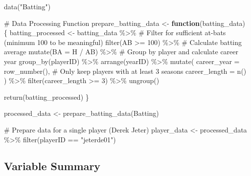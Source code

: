 \documentclass[
  letterpaper,
  DIV=11,
  numbers=noendperiod]{scrartcl}
\newenvironment{Shaded}{\begin{snugshade}}{\end{snugshade}}
\newcommand{\AttributeTok}[1]{\textcolor[rgb]{0.40,0.45,0.13}{#1}}
\newcommand{\CommentTok}[1]{\textcolor[rgb]{0.37,0.37,0.37}{#1}}
\newcommand{\ControlFlowTok}[1]{\textcolor[rgb]{0.00,0.23,0.31}{\textbf{#1}}}
\newcommand{\DecValTok}[1]{\textcolor[rgb]{0.68,0.00,0.00}{#1}}
\newcommand{\FunctionTok}[1]{\textcolor[rgb]{0.28,0.35,0.67}{#1}}
\newcommand{\NormalTok}[1]{\textcolor[rgb]{0.00,0.23,0.31}{#1}}
\newcommand{\OtherTok}[1]{\textcolor[rgb]{0.00,0.23,0.31}{#1}}
\newcommand{\SpecialCharTok}[1]{\textcolor[rgb]{0.37,0.37,0.37}{#1}}
\newcommand{\StringTok}[1]{\textcolor[rgb]{0.13,0.47,0.30}{#1}}
\begin{document}
\begin{Shaded}
\begin{Highlighting}[]
\FunctionTok{data}\NormalTok{(}\StringTok{"Batting"}\NormalTok{)}


\CommentTok{\# Data Processing Function}
\NormalTok{prepare\_batting\_data }\OtherTok{\textless{}{-}} \ControlFlowTok{function}\NormalTok{(batting\_data) \{}
\NormalTok{  batting\_processed }\OtherTok{\textless{}{-}}\NormalTok{ batting\_data }\SpecialCharTok{\%\textgreater{}\%}
    \CommentTok{\# Filter for sufficient at{-}bats (minimum 100 to be meaningful)}
    \FunctionTok{filter}\NormalTok{(AB }\SpecialCharTok{\textgreater{}=} \DecValTok{100}\NormalTok{) }\SpecialCharTok{\%\textgreater{}\%}
    \CommentTok{\# Calculate batting average}
    \FunctionTok{mutate}\NormalTok{(}\AttributeTok{BA =}\NormalTok{ H }\SpecialCharTok{/}\NormalTok{ AB) }\SpecialCharTok{\%\textgreater{}\%}
    \CommentTok{\# Group by player and calculate career year}
    \FunctionTok{group\_by}\NormalTok{(playerID) }\SpecialCharTok{\%\textgreater{}\%}
    \FunctionTok{arrange}\NormalTok{(yearID) }\SpecialCharTok{\%\textgreater{}\%}
    \FunctionTok{mutate}\NormalTok{(}
      \AttributeTok{career\_year =} \FunctionTok{row\_number}\NormalTok{(),}
      \CommentTok{\# Only keep players with at least 3 seasons}
      \AttributeTok{career\_length =} \FunctionTok{n}\NormalTok{()}
\NormalTok{    ) }\SpecialCharTok{\%\textgreater{}\%}
    \FunctionTok{filter}\NormalTok{(career\_length }\SpecialCharTok{\textgreater{}=} \DecValTok{3}\NormalTok{) }\SpecialCharTok{\%\textgreater{}\%}
    \FunctionTok{ungroup}\NormalTok{()}
  
  \FunctionTok{return}\NormalTok{(batting\_processed)}
\NormalTok{\}}

\NormalTok{processed\_data }\OtherTok{\textless{}{-}} \FunctionTok{prepare\_batting\_data}\NormalTok{(Batting)}

\CommentTok{\# Prepare data for a single player (Derek Jeter)}
\NormalTok{player\_data }\OtherTok{\textless{}{-}}\NormalTok{ processed\_data }\SpecialCharTok{\%\textgreater{}\%}
  \FunctionTok{filter}\NormalTok{(playerID }\SpecialCharTok{==} \StringTok{"jeterde01"}\NormalTok{)}
\end{Highlighting}
\end{Shaded}

\subsection{Variable Summary}\label{variable-summary}
\end{document}
